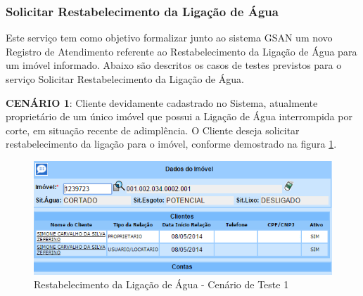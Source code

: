 \subsubsection{Solicitar Restabelecimento da Ligação de Água}
Este serviço tem como objetivo formalizar junto ao sistema GSAN um novo Registro de Atendimento referente ao Restabelecimento da Ligação de Água para um imóvel informado.
Abaixo são descritos os casos de testes previstos para o serviço Solicitar Restabelecimento da Ligação de Água.
\begin{flushleft}
	\begin{description}
		\item \textbf{CENÁRIO 1}: Cliente devidamente cadastrado no Sistema, atualmente proprietário de um único imóvel que possui a Ligação de Água interrompida por corte, em situação recente de adimplência. O Cliente deseja solicitar restabelecimento da ligação para o imóvel, conforme demostrado na figura \ref{figura:restabelecimentoLigacaoCenario1}.
		\begin{figure}[H]
			\centering
			\caption{Restabelecimento da Ligação de Água - Cenário de Teste 1}
			\label{figura:restabelecimentoLigacaoCenario1}
			\includegraphics{figuras/cenarios/restabelecimento/cenario_1.PNG}
		\end{figure}
	\end{description}
	

\end{flushleft}
